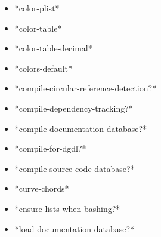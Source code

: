 \documentclass [11pt]{book}
\begin{document}
\begin{itemize}

\item {}*color-plist*





\item {}*color-table*





\item {}*color-table-decimal*





\item {}*colors-default*





\item {}*compile-circular-reference-detection?*





\item {}*compile-dependency-tracking?*





\item {}*compile-documentation-database?*





\item {}*compile-for-dgdl?*





\item {}*compile-source-code-database?*





\item {}*curve-chords*





\item {}*ensure-lists-when-bashing?*





\item {}*load-documentation-database?*






\end{itemize}
\end{document}
